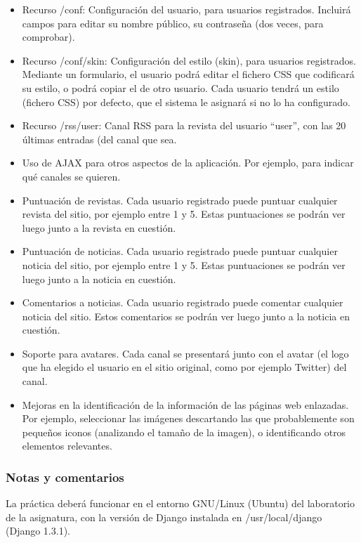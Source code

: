 \begin{itemize}

\item Recurso /conf: Configuración del usuario, para usuarios registrados. Incluirá campos para editar su nombre público, su contraseña (dos veces, para comprobar).
\item Recurso /conf/skin: Configuración del estilo (skin), para usuarios registrados. Mediante un formulario, el usuario podrá editar el fichero CSS que codificará su estilo, o podrá copiar el de otro usuario. Cada usuario tendrá un estilo (fichero CSS) por defecto, que el sistema le asignará si no lo ha configurado.
\item Recurso /rss/user: Canal RSS para la revista del usuario ``user'', con las 20 últimas entradas (del canal que sea.
\item Uso de AJAX para otros aspectos de la aplicación. Por ejemplo, para indicar qué canales se quieren.
\item Puntuación de revistas. Cada usuario registrado puede puntuar cualquier revista del sitio, por ejemplo entre 1 y 5. Estas puntuaciones se podrán ver luego junto a la revista en cuestión.
\item Puntuación de noticias. Cada usuario registrado puede puntuar cualquier noticia del sitio, por ejemplo entre 1 y 5. Estas puntuaciones se podrán ver luego junto a la noticia en cuestión.
\item Comentarios a noticias. Cada usuario registrado puede comentar cualquier noticia del sitio. Estos comentarios se podrán ver luego junto a la noticia en cuestión.
\item Soporte para avatares. Cada canal se presentará junto con el avatar (el logo que ha elegido el usuario en el sitio original, como por ejemplo Twitter) del canal.
\item Mejoras en la identificación de la información de las páginas web enlazadas. Por ejemplo, seleccionar las imágenes descartando las que probablemente son pequeños iconos (analizando el tamaño de la imagen), o identificando otros elementos relevantes.
\end{itemize}

\subsubsection{Notas y comentarios}

La práctica deberá funcionar en el entorno GNU/Linux (Ubuntu) del laboratorio de la asignatura, con la versión de Django instalada en /usr/local/django (Django 1.3.1).

